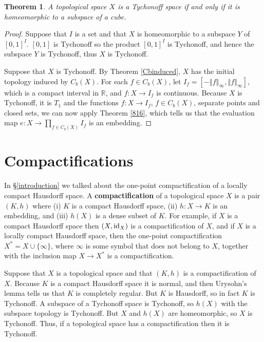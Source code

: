 \documentclass{article}
\newcommand{\id}{\ensuremath\mathrm{id}}
\newcommand{\norm}[1]{\left\Vert #1 \right\Vert}
\newtheorem{theorem}{Theorem}
\theoremstyle{definition}
\begin{document}
\begin{theorem}
A topological space $X$ is a Tychonoff space if and only if it is homeomorphic to a subspace of a cube.
\label{cube}
\end{theorem}
\begin{proof}
Suppose that $I$ is a set and that $X$ is homeomorphic to a subspace $Y$ of $[0,1]^I$. $[0,1]$ is Tychonoff so the product
$[0,1]^I$ is Tychonoff, and hence the subspace $Y$ is Tychonoff, thus $X$ is Tychonoff.

Suppose that $X$ is Tychonoff. By Theorem \ref{Cbinduced}, $X$ has the initial topology induced by $C_b(X)$. 
For each $f \in C_b(X)$, let $I_f =[-\norm{f}_\infty,\norm{f}_\infty]$, which is a compact interval in $\mathbb{R}$, and
$f:X \to I_f$ is continuous. Because $X$ is Tychonoff, it is $T_1$
and the functions $f:X \to I_f$, $f \in C_b(X)$, separate points and closed sets,
we can  now apply
Theorem \ref{816}, which tells us that the evaluation map $e:X \to \prod_{f \in C_b(X)} I_f$ is an embedding. 
\end{proof}



\section{Compactifications}
In \S \ref{introduction} we  talked about the one-point compactification of a locally compact Hausdorff space.
A \textbf{compactification} of a topological space $X$ is a pair $(K,h)$ where (i) $K$ is a compact Hausdorff space, (ii) $h:X \to K$ is an embedding, 
and (iii) $h(X)$ is a dense subset of $K$. For example, if $X$ is a compact Hausdorff space then $(X,\id_X)$ is a compactification of $X$, and if $X$ is a locally
compact Hausdorff space, then the one-point compactification $X^*=X \cup \{\infty\}$, where $\infty$ is some symbol that does not belong to $X$, together with
 the inclusion map $X \to X^*$ is a compactification. 
 
Suppose that $X$ is a topological space and that $(K,h)$ is a compactification of $X$. Because $K$ is a compact Hausdorff space it is normal, and then
Urysohn's lemma tells us that $K$ is completely regular. But $K$ is Hausdorff, so in fact $K$ is Tychonoff. A subspace of a Tychonoff space is Tychonoff,
so $h(X)$ with the subspace topology is Tychonoff. But $X$ and $h(X)$ are homeomorphic, so $X$ is Tychonoff. Thus, if a topological space has a compactification
then it is Tychonoff. 
\end{document}
